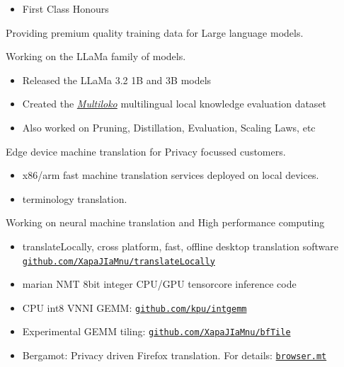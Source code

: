 \documentclass[10pt,a4paper]{altacv}
\newcommand\rurl[1]{%
  \href{https://#1}{\nolinkurl{#1}}%
}
\begin{document}
\begin{itemize}
\item First Class Honours
\end{itemize}



Providing premium quality training data for Large language models.

\divider

Working on the LLaMa family of models.
\begin{itemize}
    \item Released the LLaMa 3.2 1B and 3B models
    \item Created the \href{https://www.kaggle.com/datasets/metaresearch/multiloko}{\textit{Multiloko}} multilingual local knowledge evaluation dataset
    \item Also worked on Pruning, Distillation, Evaluation, Scaling Laws, etc
\end{itemize}

\divider

Edge device machine translation for Privacy focussed customers.
\begin{itemize}
    \item x86/arm fast machine translation services deployed on local devices.
    \item terminology translation.
\end{itemize}

\divider

Working on neural machine translation and High performance computing
\begin{itemize}
    \item translateLocally, cross platform, fast, offline desktop translation software {\rurl{github.com/XapaJIaMnu/translateLocally}}
    \item marian NMT 8bit integer CPU/GPU tensorcore inference code
    \item CPU int8 VNNI GEMM: {\rurl{github.com/kpu/intgemm}}
    \item Experimental GEMM tiling: {\rurl{github.com/XapaJIaMnu/bfTile}}
    \item Bergamot: Privacy driven Firefox translation. For details: {\rurl{browser.mt}}
\end{itemize}
\end{document}
